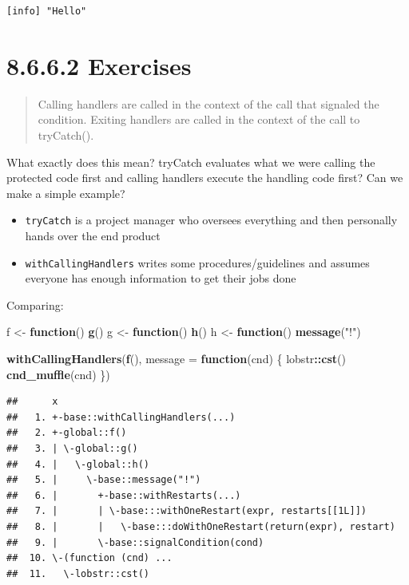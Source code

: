 \documentclass[]{book}
\newenvironment{Shaded}{\begin{snugshade}}{\end{snugshade}}
\newcommand{\ControlFlowTok}[1]{\textcolor[rgb]{0.13,0.29,0.53}{\textbf{#1}}}
\newcommand{\DataTypeTok}[1]{\textcolor[rgb]{0.13,0.29,0.53}{#1}}
\newcommand{\KeywordTok}[1]{\textcolor[rgb]{0.13,0.29,0.53}{\textbf{#1}}}
\newcommand{\NormalTok}[1]{#1}
\newcommand{\OperatorTok}[1]{\textcolor[rgb]{0.81,0.36,0.00}{\textbf{#1}}}
\newcommand{\StringTok}[1]{\textcolor[rgb]{0.31,0.60,0.02}{#1}}
\providecommand{\tightlist}{%
  \setlength{\itemsep}{0pt}\setlength{\parskip}{0pt}}
\begin{document}
\begin{verbatim}
[info] "Hello"
\end{verbatim}

\hypertarget{exercises-6}{%
\section*{8.6.6.2 Exercises}\label{exercises-6}}

\begin{quote}
Calling handlers are called in the context of the call that signaled the condition. Exiting handlers are called in the context of the call to tryCatch().
\end{quote}

What exactly does this mean? tryCatch evaluates what we were calling the protected code first and calling handlers execute the handling code first? Can we make a simple example?

\begin{itemize}
\tightlist
\item
  \texttt{tryCatch} is a project manager who oversees everything and then personally hands over the end product
\item
  \texttt{withCallingHandlers} writes some procedures/guidelines and assumes everyone has enough information to get their jobs done
\end{itemize}

Comparing:

\begin{Shaded}
\begin{Highlighting}[]
\NormalTok{f <-}\StringTok{ }\ControlFlowTok{function}\NormalTok{() }\KeywordTok{g}\NormalTok{()}
\NormalTok{g <-}\StringTok{ }\ControlFlowTok{function}\NormalTok{() }\KeywordTok{h}\NormalTok{()}
\NormalTok{h <-}\StringTok{ }\ControlFlowTok{function}\NormalTok{() }\KeywordTok{message}\NormalTok{(}\StringTok{"!"}\NormalTok{)}

\KeywordTok{withCallingHandlers}\NormalTok{(}\KeywordTok{f}\NormalTok{(), }\DataTypeTok{message =} \ControlFlowTok{function}\NormalTok{(cnd) \{}
\NormalTok{  lobstr}\OperatorTok{::}\KeywordTok{cst}\NormalTok{()}
  \KeywordTok{cnd_muffle}\NormalTok{(cnd)}
\NormalTok{\})}
\end{Highlighting}
\end{Shaded}

\begin{verbatim}
##      x
##   1. +-base::withCallingHandlers(...)
##   2. +-global::f()
##   3. | \-global::g()
##   4. |   \-global::h()
##   5. |     \-base::message("!")
##   6. |       +-base::withRestarts(...)
##   7. |       | \-base:::withOneRestart(expr, restarts[[1L]])
##   8. |       |   \-base:::doWithOneRestart(return(expr), restart)
##   9. |       \-base::signalCondition(cond)
##  10. \-(function (cnd) ...
##  11.   \-lobstr::cst()
\end{verbatim}
\end{document}
